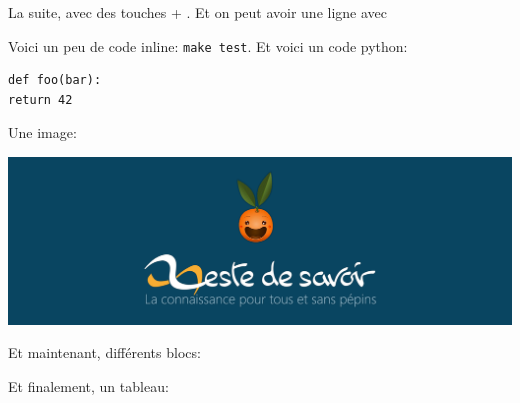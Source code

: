 \documentclass[small]{zmdocument}
\begin{document}
La suite, avec des touches  + . Et on peut avoir une ligne avec

\horizontalLine

Voici un peu de code inline: \verb`make test`. Et voici un code python:

\begin{verbatim}
def foo(bar):
return 42
\end{verbatim}

Une image: 

\begin{center}
\includegraphics[width=\linewidth]{logo.png}
\end{center}

Et maintenant, différents blocs:

\begin{Information}
\blindtext
\end{Information}

\begin{Question}
\blindtext
\end{Question}

\begin{Warning}
\blindtext
\end{Warning}

\begin{Error}
\blindtext
\end{Error}

Et finalement, un tableau:
\end{document}
